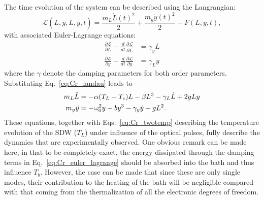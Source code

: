 The time evolution of the system can be described using the Langrangian:
\begin{equation}
    \mathcal{L}(L, y, \dot{L}, \dot{y}, t) = \frac{m_L \dot{L}(t)^2}{2} + \frac{m_y \dot{y}(t)^2}{2} - F(L, y, t),
\end{equation}
with associated Euler-Lagrange equations:
\begin{align}
    \frac{\partial \mathcal{L}}{\partial L} - \frac{d}{dt}\frac{\partial \mathcal{L}}{\partial \dot{L}} &= \gamma_y \dot{L}\\
    \frac{\partial \mathcal{L}}{\partial y} - \frac{d}{dt}\frac{\partial \mathcal{L}}{\partial \dot{y}} &= \gamma_L \dot{y}\nonumber
\end{align}
where the $\gamma$ denote the damping parameters for both order parameters.
Substituting Eq.~\ref{eq:Cr_landau} leads to 
\begin{align}
	\label{eq:Cr_euler_lagrange}
	    m_L \Ddot{L} &= -\alpha(T_L-T_c)L - \beta L^3 - \gamma_L \dot{L} + 2g L y \\
	    m_y \Ddot{y} &= -\omega_0^2 y  - b y^3 - \gamma_y \dot{y} + gL^2.\nonumber
\end{align}
These equations, together with Eqs.~\ref{eq:Cr_twotemp} describing the temperature evolution of the SDW ($T_L$) under influence of the optical pulses, fully describe the dynamics that are experimentally observed.
One obvious remark can be made here, in that to be completely exact, the energy dissipated through the damping terms in Eq.~\ref{eq:Cr_euler_lagrange} should be absorbed into the bath and thus influence $T_b$. However, the case can be made that since these are only single modes, their contribution to the heating of the bath will be negligible compared with that coming from the thermalization of all the electronic degrees of freedom.

